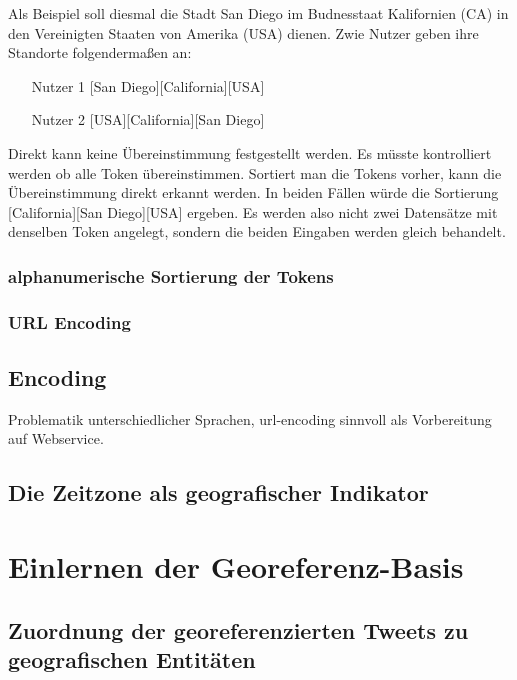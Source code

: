 		  		Als Beispiel soll diesmal die Stadt San Diego im Budnesstaat Kalifornien (CA) in den Vereinigten Staaten von Amerika (USA) dienen. 
		  		Zwie Nutzer geben ihre Standorte folgendermaßen an:

		  		\begin{enumerate}
		  			\item[Nutzer 1]  	[San Diego][California][USA]
		  			\item[Nutzer 2] 	[USA][California][San Diego] 
		  		\end{enumerate}

		  		Direkt kann keine Übereinstimmung festgestellt werden. 
		  		Es müsste kontrolliert werden ob alle Token übereinstimmen.
		  		Sortiert man die Tokens vorher, kann die Übereinstimmung direkt erkannt werden.
		  		In beiden Fällen würde die Sortierung [California][San Diego][USA] ergeben.
		  		Es werden also nicht zwei Datensätze mit denselben Token angelegt, sondern die beiden Eingaben werden gleich behandelt.





		  	\subsubsection{alphanumerische Sortierung der Tokens}

		  	\subsubsection{URL Encoding}
		  		\subsection{Encoding}
				Problematik unterschiedlicher Sprachen, 
				url-encoding sinnvoll als Vorbereitung auf Webservice. 

		  	

		\subsection{Die Zeitzone als geografischer Indikator}     

	\section{Einlernen der Georeferenz-Basis}

		\subsection{Zuordnung der georeferenzierten Tweets zu geografischen Entitäten} 

